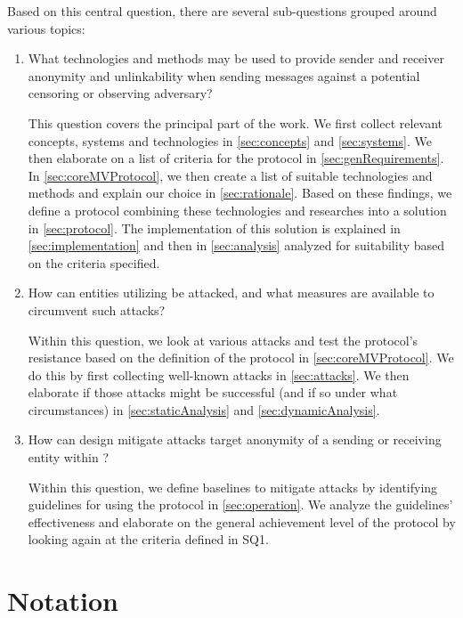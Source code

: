 Based on this central question, there are several sub-questions grouped around various topics:

\begin{enumerate}
	\item What technologies and methods may be used to provide sender and receiver anonymity and unlinkability when sending messages against a potential censoring or observing adversary? 
	
	This question covers the principal part of the work. We first collect relevant concepts, systems and technologies in \cref{sec:concepts} and \ref{sec:systems}. We then elaborate on a list of criteria for the \MessageVortex{} protocol in \cref{sec:genRequirements}. In \cref{sec:coreMVProtocol}, we then create a list of suitable technologies and methods and explain our choice in \cref{sec:rationale}. Based on these findings, we define a protocol combining these technologies and researches into a solution in \cref{sec:protocol}. The implementation of this solution is explained in \cref{sec:implementation} and then in \cref{sec:analysis} analyzed for suitability based on the criteria specified. 
	
	\item How can entities utilizing \MessageVortex{} be attacked, and what measures are available to circumvent such attacks? 
	
	Within this question, we look at various attacks and test the protocol's resistance based on the definition of the protocol in \cref{sec:coreMVProtocol}. We do this by first collecting well-known attacks in \cref{sec:attacks}. We then elaborate if those attacks might be successful (and if so under what circumstances) in \cref{sec:staticAnalysis} and \cref{sec:dynamicAnalysis}.
	
	\item How can design mitigate attacks target anonymity of a sending or receiving entity within \MessageVortex? 
	
	Within this question, we define baselines to mitigate attacks by identifying guidelines for using the protocol in \cref{sec:operation}. We analyze the guidelines' effectiveness and elaborate on the general achievement level of the protocol by looking again at the criteria defined in SQ1. 
	
\end{enumerate}

\chapter{Notation}

